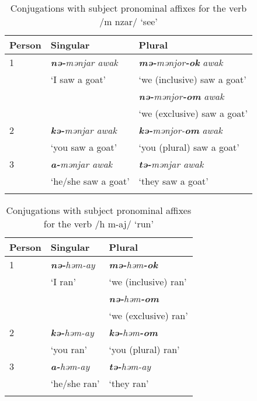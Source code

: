 \begin{table}
\begin{tabular}{lll}
\lsptoprule
{Person} & {Singular} & {Plural}\\\midrule
{1} & \textit{\textbf{nə-}mənjar awak} & \textbf{\textit{mə-}}\textit{mənjor}\textbf{\textit{{}-ok}} \textit{awak}\\
& ‘I saw a goat’ & ‘we (inclusive) saw a goat’\\
&  & \textbf{\textit{nə-}}\textit{mənjor}\textbf{\textit{{}-om}} \textit{awak}\\
& & ‘we (exclusive) saw a goat’\\\midrule
{2} & \textbf{\textit{kə-}}\textit{mənjar awak} & \textbf{\textit{kə-}}\textit{mənjor-}\textbf{\textit{om}} \textit{awak}\\
& ‘you saw a goat’  & ‘you (plural) saw a goat’\\\midrule
{3} & \textbf{\textit{a-}}\textit{mənjar awak} & \textbf{\textit{tə-}}\textit{mənjar awak}\\    
& ‘he/she saw a goat’  & ‘they saw a goat’\\
\lspbottomrule
\end{tabular}
\caption{Conjugations with subject pronominal affixes for the verb /m nzar/ ‘see’}\label{tab:56}
\end{table}

\begin{table}
\begin{tabular}{lll}
\lsptoprule
{Person} & {Singular} & {Plural}\\\midrule
{1} & \textbf{\textit{nə-}}\textit{həm-ay} & \textbf{\textit{mə{}-}}\textit{həm}\textbf{\textit{{}-ok}}  \\
& ‘I ran’ & ‘we (inclusive) ran’\\
&  & \textbf{\textit{nə{}-}}\textit{həm}\textbf{\textit{{}-om}} \\  
& & ‘we (exclusive) ran’\\\midrule
{2} & \textbf{\textit{kə-}}\textit{həm-ay}  & \textbf{\textit{kə{}-}}\textit{həm}\textbf{\textit{{}-om}}\\
& ‘you ran’ & ‘you (plural) ran’\\\midrule
{3} & \textbf{\textit{a-}}\textit{həm-ay} & \textbf{\textit{tə-}}\textit{həm-ay}\\
& ‘he/she ran’ & ‘they ran’\\
\lspbottomrule
\end{tabular}
\caption {\label{tab:57} Conjugations with subject pronominal affixes for the verb /h m-aj/ ‘run’}
\end{table}


